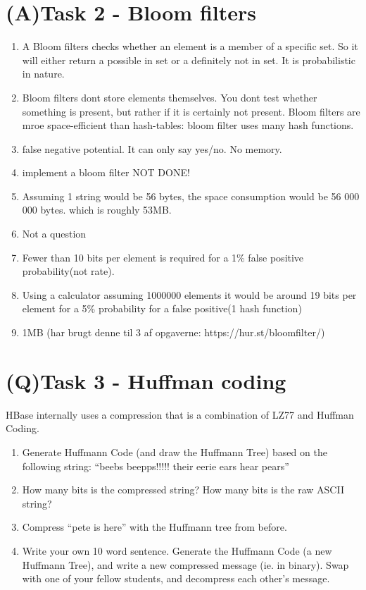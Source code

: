 \documentclass[a4paper,12pt]{article}
\begin{document}
\section{(A)Task 2 - Bloom filters}
\begin{enumerate}
\item A Bloom filters checks whether an element is a member of a specific set. So it will either return a possible in set or a definitely not in set. It is probabilistic in nature.
\item Bloom filters dont store elements themselves. You dont test whether something is present, but rather if it is certainly not present. Bloom filters are mroe space-efficient than hash-tables: bloom filter uses many hash functions.
\item false negative potential. It can only say yes/no. No memory.
\item implement a bloom filter NOT DONE!
\item Assuming 1 string would be 56 bytes, the space consumption would be 56 000 000 bytes. which is roughly 53MB. 
\item Not a question
\item Fewer than 10 bits per element is required for a 1\% false positive probability(not rate).
\item Using a calculator assuming 1000000 elements it would be around 19 bits per element for a 5\%  probability for a false positive(1 hash function)
\item 1MB (har brugt denne til 3 af opgaverne: https://hur.st/bloomfilter/)
\end{enumerate}

\clearpage

\section{(Q)Task 3 - Huffman coding}

HBase internally uses a compression that is a combination of LZ77 and Huffman Coding.\\
\begin{enumerate}
\item Generate Huffmann Code (and draw the Huffmann Tree) based on the
following string: “beebs beepps!!!!! their eerie ears hear pears”
\item How many bits is the compressed string? How many bits is the raw ASCII
string?
\item Compress “pete is here” with the Huffmann tree from before.
\item Write your own 10 word sentence. Generate the Huffmann Code (a new
Huffmann Tree), and write a new compressed message (ie. in binary).
Swap with one of your fellow students, and decompress each other’s message.
\end{enumerate}
\end{document}
